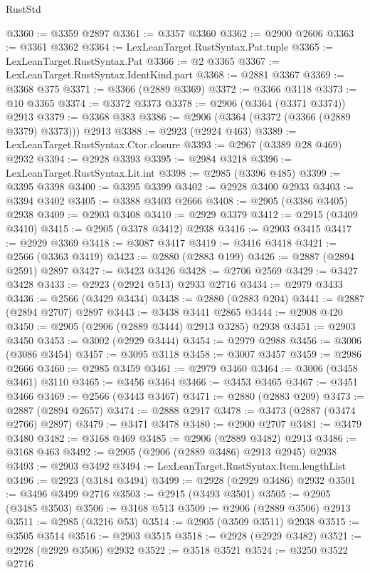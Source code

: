 \begin{lexlean}{RustStd}
\begin{coremodule}
{\begin{coremodule}
{{{{{{{{{{{{{{{{{{{{{{{{{{{{{{{{{{{{{{{{{{{{{{{{{{{{{{{{{{{{{{{{{{{{{{{{{{{{{{@3360 := @3359 @2897
@3361 := @3357 @3360
@3362 := @2900 @2606
@3363 := @3361 @3362
@3364 := LexLeanTarget.RustSyntax.Pat.tuple
@3365 := LexLeanTarget.RustSyntax.Pat
@3366 := @2 @3365
@3367 := LexLeanTarget.RustSyntax.IdentKind.part
@3368 := @2881 @3367
@3369 := @3368 @375
@3371 := @3366 (@2889 @3369)
@3372 := @3366 @3118
@3373 := @10 @3365
@3374 := @3372 @3373
@3378 := @2906 (@3364 (@3371 @3374)) @2913
@3379 := @3368 @383
@3386 := @2906 (@3364 (@3372 (@3366 (@2889 @3379) @3373))) @2913
@3388 := @2923 (@2924 @463)
@3389 := LexLeanTarget.RustSyntax.Ctor.closure
@3393 := @2967 (@3389 @28 @469) @2932
@3394 := @2928 @3393
@3395 := @2984 @3218
@3396 := LexLeanTarget.RustSyntax.Lit.int
@3398 := @2985 (@3396 @485)
@3399 := @3395 @3398
@3400 := @3395 @3399
@3402 := @2928 @3400 @2933
@3403 := @3394 @3402
@3405 := @3388 @3403 @2666
@3408 := @2905 (@3386 @3405) @2938
@3409 := @2903 @3408
@3410 := @2929 @3379
@3412 := @2915 (@3409 @3410)
@3415 := @2905 (@3378 @3412) @2938
@3416 := @2903 @3415
@3417 := @2929 @3369
@3418 := @3087 @3417
@3419 := @3416 @3418
@3421 := @2566 (@3363 @3419)
@3423 := @2880 (@2883 @199)
@3426 := @2887 (@2894 @2591) @2897
@3427 := @3423 @3426
@3428 := @2706 @2569
@3429 := @3427 @3428
@3433 := @2923 (@2924 @513) @2933 @2716
@3434 := @2979 @3433
@3436 := @2566 (@3429 @3434)
@3438 := @2880 (@2883 @204)
@3441 := @2887 (@2894 @2707) @2897
@3443 := @3438 @3441 @2865
@3444 := @2908 @420
@3450 := @2905 (@2906 (@2889 @3444) @2913 @3285) @2938
@3451 := @2903 @3450
@3453 := @3002 (@2929 @3444)
@3454 := @2979 @2988
@3456 := @3006 (@3086 @3454)
@3457 := @3095 @3118
@3458 := @3007 @3457
@3459 := @2986 @2666
@3460 := @2985 @3459
@3461 := @2979 @3460
@3464 := @3006 (@3458 @3461) @3110
@3465 := @3456 @3464
@3466 := @3453 @3465
@3467 := @3451 @3466
@3469 := @2566 (@3443 @3467)
@3471 := @2880 (@2883 @209)
@3473 := @2887 (@2894 @2657)
@3474 := @2888 @2917
@3478 := @3473 (@2887 (@3474 @2766) @2897)
@3479 := @3471 @3478
@3480 := @2900 @2707
@3481 := @3479 @3480
@3482 := @3168 @469
@3485 := @2906 (@2889 @3482) @2913
@3486 := @3168 @463
@3492 := @2905 (@2906 (@2889 @3486) @2913 @2945) @2938
@3493 := @2903 @3492
@3494 := LexLeanTarget.RustSyntax.Item.lengthList
@3496 := @2923 (@3184 @3494)
@3499 := @2928 (@2929 @3486) @2932
@3501 := @3496 @3499 @2716
@3503 := @2915 (@3493 @3501)
@3505 := @2905 (@3485 @3503)
@3506 := @3168 @513
@3509 := @2906 (@2889 @3506) @2913
@3511 := @2985 (@3216 @53)
@3514 := @2905 (@3509 @3511) @2938
@3515 := @3505 @3514
@3516 := @2903 @3515
@3518 := @2928 (@2929 @3482)
@3521 := @2928 (@2929 @3506) @2932
@3522 := @3518 @3521
@3524 := @3250 @3522 @2716
}}}}}}}}}}}}}}}}}}}}}}}}}}}}}}}}}}}}}}}}}}}}}}}}}}}}}}}}}}}}}}}}}}}}}}}}}}}}}}
\end{coremodule}}
\end{coremodule}
\end{lexlean}
